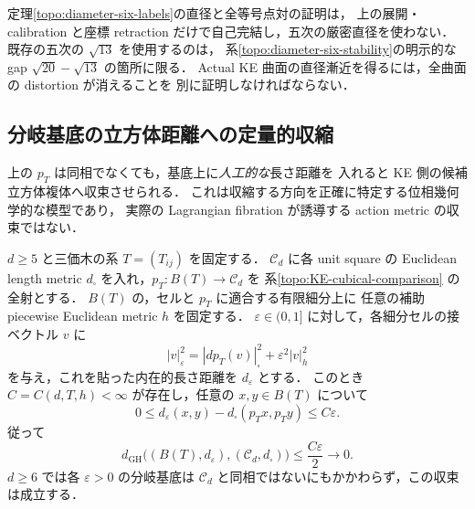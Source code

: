 \begin{remark}[五次の直径の使用範囲]
定理\ref{topo:diameter-six-labels}の直径と全等号点対の証明は，
上の展開・calibration と座標 retraction だけで自己完結し，五次の厳密直径を使わない．
既存の五次の $\sqrt{13}$ を使用するのは，
系\ref{topo:diameter-six-stability}の明示的な gap
$\sqrt{20}-\sqrt{13}$ の箇所に限る．
Actual KE 曲面の直径漸近を得るには，全曲面の distortion が消えることを
別に証明しなければならない．
\end{remark}

\subsection{分岐基底の立方体距離への定量的収縮}

上の $p_T$ は同相でなくても，基底上に\emph{人工的な}長さ距離を
入れると KE 側の候補立方体複体へ収束させられる．
これは収縮する方向を正確に特定する位相幾何学的な模型であり，
実際の Lagrangian fibration が誘導する action metric の収束ではない．

\begin{theorem}[有限分岐基底の立方体計量への収縮]
\label{topo:metric-collapse}
$d\ge5$ と三価木の系 $T=(T_{ij})$ を固定する．
$\mathcal C_d$ に各 unit square の Euclidean length metric
$d_\square$ を入れ，$p_T:B(T)\to\mathcal C_d$ を
系\ref{topo:KE-cubical-comparison} の全射とする．
$B(T)$ の，セルと $p_T$ に適合する有限細分上に
任意の補助 piecewise Euclidean metric $h$ を固定する．
$\varepsilon\in(0,1]$ に対して，各細分セルの接ベクトル $v$ に
\[
 |v|_\varepsilon^2
 =|d p_T(v)|_\square^2+\varepsilon^2|v|_h^2
\]
を与え，これを貼った内在的長さ距離を $d_\varepsilon$ とする．
このとき $C=C(d,T,h)<\infty$ が存在し，任意の
$x,y\in B(T)$ について
\[
 0\le d_\varepsilon(x,y)
       -d_\square(p_Tx,p_Ty)\le C\varepsilon .
\]
従って
\[
 d_{\mathrm{GH}}\bigl((B(T),d_\varepsilon),
                  (\mathcal C_d,d_\square)\bigr)
 \le \frac{C\varepsilon}{2}\longrightarrow0 .
\]
$d\ge6$ では各 $\varepsilon>0$ の分岐基底は
$\mathcal C_d$ と同相ではないにもかかわらず，この収束は成立する．
\end{theorem}


